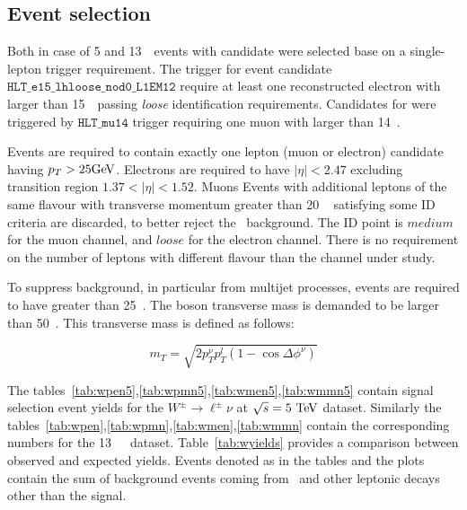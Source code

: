 \subsection{Event selection}
\label{subsec:wselection}
Both in case of 5 and 13~\TeV\ events with \Wln{} candidate were selected base on a single-lepton trigger requirement.
The trigger for \Wen event candidate $\texttt{HLT\_e15\_lhloose\_nod0\_L1EM12}$ require at least one reconstructed electron with \ET larger than 15~\GeV\ passing \emph{loose} identification requirements. Candidates for \Wmn were triggered by $\texttt{HLT\_mu14}$ trigger requiring one muon with \ET larger than 14~\GeV.

Events are required to contain exactly one lepton (muon or electron) candidate having $p_T > 25\text{Ge\kern -0.1em V}$. Electrons are required to have $|\eta|<2.47$ excluding transition region $1.37 < |\eta|< 1.52$. Muons   
Events with additional leptons of the same flavour with transverse momentum greater than 20 ~\GeV{} satisfying some ID criteria are discarded, to better reject the \Zboson\ background. The ID point is $medium$ for the muon channel, and $loose$ for the electron channel. There is no requirement on the number of leptons with different flavour than the channel under study.

To suppress background, in particular from multijet processes,
events are required to have \MET{} greater than 25~\GeV{}.
The \Wboson{} boson transverse mass \mt{} is demanded to be larger than 50~\GeV.
This transverse mass is defined as follows:

\begin{equation}\label{eq:mt}
{m}_{T} = \sqrt{2 {p}_{T}^{\nu}p_{T} ^{l} (1-\cos\Delta\phi^{\nu})}
\end{equation}

The tables~\ref{tab:wpen5},\ref{tab:wpmn5},\ref{tab:wmen5},\ref{tab:wmmn5} contain signal selection event yields for the $W^{\pm} \rightarrow \ell^{\pm}\nu$  at $\sqrt{s} = 5~\text{Te\kern -0.1em V}$ \lowmu dataset. Similarly the tables~\ref{tab:wpen},\ref{tab:wpmn},\ref{tab:wmen},\ref{tab:wmmn} contain the corresponding numbers for the 13~\TeV\ \lowmu\ dataset. Table~\ref{tab:wyields} provides a comparison between observed and expected yields.
Events denoted as \Wln{} in the tables and the plots contain the sum of background events coming from \Wtaunu\ and other \Wboson{} leptonic decays other than the signal.







